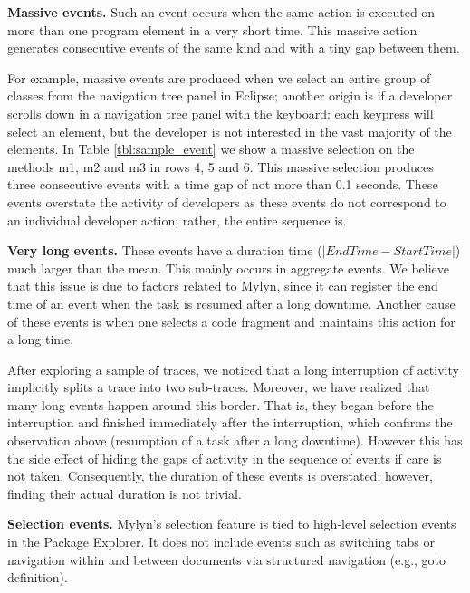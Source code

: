 \documentclass[times]{smrauth}
\newcommand\RR[1]{\textbf{Romain #1}}
\begin{document}
\textbf{Massive events. } Such an event occurs when the same action is executed on more than one program element in a very short time. This massive action generates consecutive events of the same kind and with a tiny gap between them.

For example, massive events are produced when we select an entire group of classes from the navigation tree panel in Eclipse; another origin is if a developer scrolls down in a navigation tree panel with the keyboard: each keypress will select an element, but the developer is not interested in the vast majority of the elements. In  Table \ref{tbl:sample_event} we show a massive selection on the methods m1, m2 and m3  in rows 4, 5 and 6. This massive selection produces three consecutive events with a time gap of not more than 0.1 seconds. These events overstate the activity of developers as these events do not correspond to an individual developer action; rather, the entire sequence is.


\textbf{Very long events. } These events have a duration time ($|EndTime - StartTime|$) much larger than the mean. This mainly occurs in aggregate events. We believe that this issue is due to factors related to Mylyn, since it can register the end time of an event when the task is resumed after a long downtime. Another cause of these events is when one selects a code fragment and maintains this action for a long time. 
 
After exploring a sample of traces, we noticed that a long interruption of activity implicitly splits a trace into two sub-traces.  Moreover,  we have realized that many long events happen around this border. That is, they began before the interruption and finished immediately after the interruption, which confirms the observation above (resumption of a task after a long downtime). However this has the side effect of hiding the gaps of activity in the sequence of events if care is not taken. Consequently, the duration of these events is overstated; however, finding their actual duration is not trivial. 

\textbf{Selection events. } Mylyn's selection feature is tied to high-level selection events in the Package Explorer. It does not include events such as switching tabs or navigation within and between documents via structured navigation (e.g., goto definition).
\end{document}
